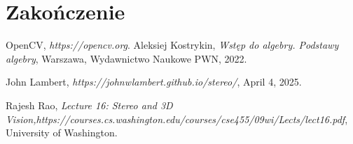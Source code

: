 \documentclass[magisterska]{pracadypl}
\begin{document}
\chapter{Zakończenie}

\begin{thebibliography}{7}
%
OpenCV, 
\textit{https://opencv.org}.
%
Aleksiej Kostrykin, 
\textit{Wstęp do algebry. Podstawy algebry},
Warszawa, Wydawnictwo Naukowe PWN, 2022.

John Lambert, 
\textit{https://johnwlambert.github.io/stereo/}, April 4, 2025.

Rajesh Rao, 
\textit{Lecture 16: Stereo and 3D Vision,https://courses.cs.washington.edu/courses/cse455/09wi/Lects/lect16.pdf}, University of Washington.


\end{thebibliography}
\end{document}
